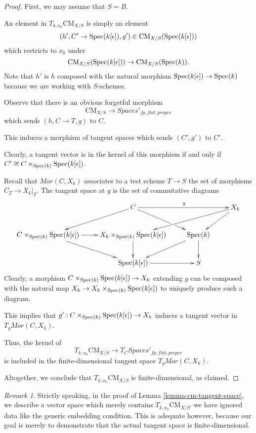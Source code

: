 \documentclass{stacks-project}
\theoremstyle{plain}
\theoremstyle{definition}
\DeclareMathOperator{\Spec}{Spec}
\theoremstyle{remark}
\newtheorem{remark}[subsection]{Remark}
\numberwithin{equation}{subsection}
\def\Spec{\mathop{\rm Spec}}
\def\CMfunctor{\mathcal{C}\!{\it oh}}
\def\CMfunctor{\text{CM}}
\begin{document}
\begin{proof}
	First, we may assume that $S=B$.

	An element in $ T_{k,x_0}\CMfunctor_{X/S}$ is simply an element
	\[(h',C'\rightarrow \Spec(k[\epsilon]),g')\in \CMfunctor_{X/S}(\Spec(k[\epsilon]))\]
	which restricts to $x_0$ under 
	\[\CMfunctor_{X/S}(\Spec(k[\epsilon]))\rightarrow\CMfunctor_{X/S}(\Spec(k)).\]
	Note that $h'$ is $h$ composed with the natural morphism $\Spec(k[\epsilon])\rightarrow\Spec(k)$ because we are working with $S$-schemes.

	Observe that there is an obvious forgetful morphism
	\[\CMfunctor_{X/S}\rightarrow Spaces'_{fp,flat,proper}\]
	which sends $(h,C\rightarrow T,g)$ to $C$.

	This induces a morphism of tangent spaces which sends $(C',g')$ to $C'$.

	Clearly, a tangent vector is in the kernel of this morphism if and only if $C'\cong C\times_{\Spec(k)} \Spec(k[\epsilon])$.
	
	Recall that $Mor(C,X_k)$ associates to a test scheme $T\rightarrow S$ the set of morphisms $C_T\rightarrow X_k|_T$.
	The tangent space at $g$ is the set of commutative diagrams
	\[\xymatrix{
		&C\ar[rr]^{g}\ar[dr]|!{[d];[rr]}\hole\ar[dl] & & X_k\ar[dll]\ar[dl]\\
		C\times_{\Spec(k)}\Spec(k[\epsilon])\ar[r]\ar[dr]&X_k\times_{\Spec(k)}\Spec(k[\epsilon])\ar[d]& \Spec(k)\ar[dl]\ar[d] & \\
		&\Spec(k[\epsilon])\ar[r] & S&
	}\]
	Clearly, a morphism $C\times_{\Spec(k)}\Spec(k[\epsilon])\rightarrow X_k$ extending $g$ can be composed with the natural map $X_k\rightarrow X_k\times_{\Spec(k)}\Spec(k[\epsilon])$ to uniquely produce such a diagram.

	This implies that $g':C\times_{\Spec(k)}\Spec(k[\epsilon])\rightarrow X_k$ induces a tangent vector in $T_gMor(C,X_k)$.

	Thus, the kernel of
	\[T_{k,x_0}\CMfunctor_{X/S}\rightarrow T_{C}Spaces'_{fp,flat,proper}\]
	is included in the finite-dimensional tangent space $T_gMor(C,X_k)$.

	Altogether, we conclude that $T_{k,x_0}\CMfunctor_{X/S}$ is finite-dimensional, as claimed.
	\end{proof}
	\begin{remark}
		Strictly speaking, in the proof of Lemma \ref{lemma-cm-tangent-space}, we describe a vector space which merely contains $T_{k,x_0}\CMfunctor_{X/S}$--we have ignored data like the generic embedding condition.
		This is adequate however, because our goal is merely to demonstrate that the actual tangent space is finite-dimensional.
	\end{remark}
\end{document}
